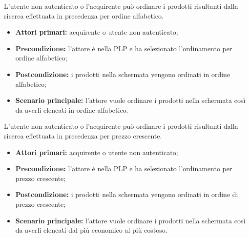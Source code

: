 
\label{ordinamento-alfabetico}

L'utente non autenticato o l'acquirente può ordinare i prodotti risultanti dalla ricerca effettuata in precedenza per ordine alfabetico.
\begin{itemize}
    \item \textbf{Attori primari:} acquirente o utente non autenticato;
    \item \textbf{Precondizione:} l'attore è nella PLP e ha selezionato l'ordinamento per ordine alfabetico;
    \item \textbf{Postcondizione:} i prodotti nella schermata vengono ordinati in ordine alfabetico;
    \item \textbf{Scenario principale:} l'attore vuole ordinare i prodotti nella schermata così da averli elencati in ordine alfabetico.
\end{itemize}


\label{ordinamento-prezzo-crescente}

L'utente non autenticato o l'acquirente può ordinare i prodotti risultanti dalla ricerca effettuata in precedenza per prezzo crescente.
\begin{itemize}
    \item \textbf{Attori primari:} acquirente o utente non autenticato;
    \item \textbf{Precondizione:} l'attore è nella PLP e ha selezionato l'ordinamento per prezzo crescente;
    \item \textbf{Postcondizione:} i prodotti nella schermata vengono ordinati in ordine di prezzo crescente;
    \item \textbf{Scenario principale:} l'attore vuole ordinare i prodotti nella schermata così da averli elencati dal più economico al più costoso.
\end{itemize}


\label{ordinamento-prezzo-decrescente}

